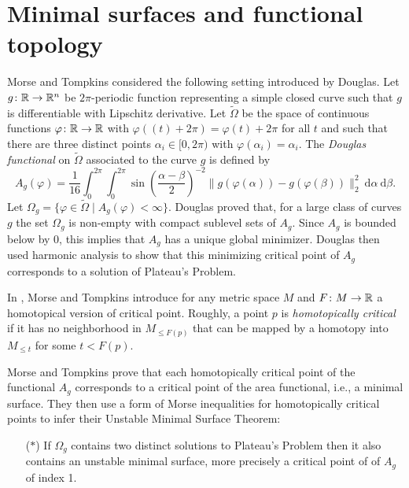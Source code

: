 
\section{Minimal surfaces and functional topology} \label{s:surfaces}

Morse and Tompkins considered the following setting introduced by Douglas.
Let $g \colon \mathbb{R} \to \mathbb{R}^n$ be $2\pi$-periodic function representing a simple closed curve such that $g$ is differentiable with Lipschitz derivative.
Let $\widetilde{\Omega}$ be the space of continuous functions $\varphi \colon \mathbb{R} \to \mathbb{R}$ with $\varphi((t)+2\pi) = \varphi(t) + 2\pi$ for all $t$ and such that there are three distinct points $\alpha_i \in [0,2\pi)$ with $\varphi(\alpha_i)=\alpha_i$.
The \emph{Douglas functional} on $\widetilde \Omega$ associated to the curve $g$ is defined by
\begin{equation*}
A_g(\varphi)=\frac{1}{16}\int_0^{2\pi}\int_0^{2\pi}\sin\left(\frac{\alpha-\beta}{2}\right)^{-2} \! \lVert g(\varphi(\alpha))-g(\varphi(\beta)) \rVert_2^2 \ \mathrm{d}\alpha \ \mathrm{d}\beta.
\end{equation*}
Let $\Omega_g=\{\varphi\in\widetilde\Omega\mid A_g(\varphi)<\infty\}$.
Douglas proved that, for a large class of curves $g$ the set $\Omega_g$ is non-empty with compact sublevel sets of $A_g$.
Since $A_g$ is bounded below by $0$, this implies that $A_g$ has a unique global minimizer.
Douglas then used harmonic analysis to show that this minimizing critical point of $A_g$ corresponds to a solution of Plateau's Problem.

In \cite[p.445]{Morse.1939}, Morse and Tompkins introduce for any metric space $M$ and $F \colon M \to \mathbb{R}$ a homotopical version of critical point.
Roughly, a point $p$ is \textit{homotopically critical} if it has no neighborhood in $M_{\leq F(p)}$ that can be mapped by a homotopy into $M_{\leq t}$ for some $t<F(p)$.

Morse and Tompkins prove that each homotopically critical point of the functional $A_g$ corresponds to a critical point of the area functional, i.e., a minimal surface.
They then use a form of Morse inequalities for homotopically critical points to infer their Unstable Minimal Surface Theorem:
\begin{itemize}
    \item[($\ast$)] If $\Omega_g$ contains two distinct solutions to Plateau's Problem then it also contains an unstable minimal surface, more precisely a critical point of of $A_g$ of index 1.
\end{itemize}

